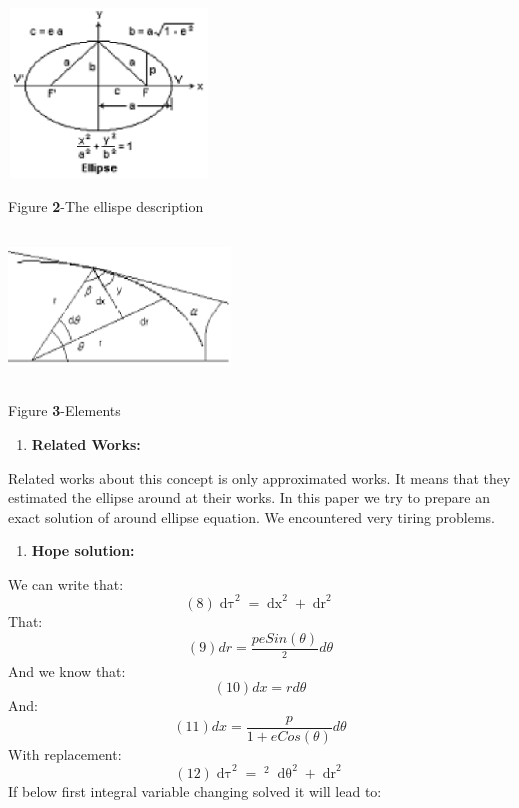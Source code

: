 \documentclass{article}
\begin{document}
\noindent \includegraphics*[width=2.10in, height=1.77in, keepaspectratio=false]{image2.eps}

\noindent Figure \textbf{2}-The ellispe description

\noindent 

\noindent \includegraphics*[width=2.32in, height=1.59in, keepaspectratio=false]{image3.eps}

\noindent Figure \textbf{3}-Elements

\noindent 

\begin{enumerate}
\item  \textbf{Related Works:}
\end{enumerate}

\noindent Related works about this concept is only approximated works. It means that they estimated the ellipse around at their works. In this paper we try to prepare an exact solution of around ellipse equation. We encountered very tiring problems. 

\begin{enumerate}
\item  \textbf{Hope solution:}
\end{enumerate}

\noindent We can write that:
\[                                (8)                         \mathop{d\tau }\nolimits^{2} =\mathop{dx}\nolimits^{2} +\mathop{dr}\nolimits^{2} \] 
That:
\[                                (9)                      dr=\frac{peSin(\theta )}{\mathop{(1+eCos(\theta ))}\nolimits^{2} } d\theta \] 
And we know that:
\[                               (10)                              dx=rd\theta \] 
And:
\[                               (11)                       dx=\frac{p}{1+eCos(\theta )} d\theta \] 
With replacement:
\[                               (12)                 \mathop{d\tau }\nolimits^{2} =\mathop{\left(\frac{p}{1+eCos(\theta )} \right)}\nolimits^{2} \mathop{d\theta }\nolimits^{2} +\mathop{dr}\nolimits^{2} \] 
If below first integral variable changing solved it will lead to:
\end{document}

